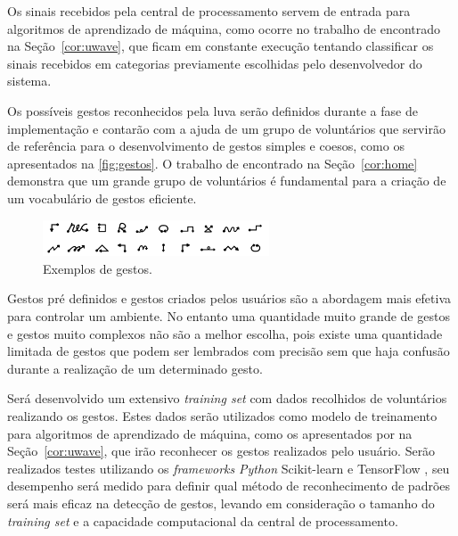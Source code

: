 Os sinais recebidos pela central de processamento servem de entrada para algoritmos de aprendizado de máquina, como ocorre no trabalho de  encontrado na Seção~\ref{cor:uwave}, que ficam em constante execução tentando classificar os sinais recebidos em categorias previamente escolhidas pelo desenvolvedor do sistema. 


Os possíveis gestos reconhecidos pela luva serão definidos durante a fase de implementação e contarão com a ajuda de um grupo de voluntários que servirão de referência para o desenvolvimento de gestos simples e coesos, como os apresentados na \autoref{fig:gestos}. O trabalho de  encontrado na Seção~\ref{cor:home} demonstra que um grande grupo de voluntários é fundamental para a criação de um vocabulário de gestos eficiente.

\begin{figure}[ht]
    \centering
    \includegraphics[width=0.6\textwidth, keepaspectratio]{resources/gestos.png}
    \caption{Exemplos de gestos. \cite{accelerometer:2006}}
    \label{fig:gestos}
\end{figure}


Gestos pré definidos e gestos criados pelos usuários são a abordagem mais efetiva para controlar um ambiente.
No entanto uma quantidade muito grande de gestos e gestos muito complexos não são a melhor escolha, pois existe uma quantidade limitada de gestos que podem ser lembrados com precisão sem que haja confusão durante a realização de um determinado gesto.

Será desenvolvido um extensivo \textit{training set} com dados recolhidos de voluntários realizando os gestos. Estes dados serão utilizados como modelo de treinamento para algoritmos de aprendizado de máquina, como os apresentados por \cite{uwave:2009} na Seção~\ref{cor:uwave}, que irão reconhecer os gestos realizados pelo usuário. Serão realizados testes utilizando os \textit{frameworks} \textit{Python} Scikit-learn \cite{scikit-learn} e TensorFlow \cite{tensorflow:2016}, seu desempenho será medido para definir qual método de reconhecimento de padrões será mais eficaz na detecção de gestos, levando em consideração o tamanho do \textit{training set} e a capacidade computacional da central de processamento. 

